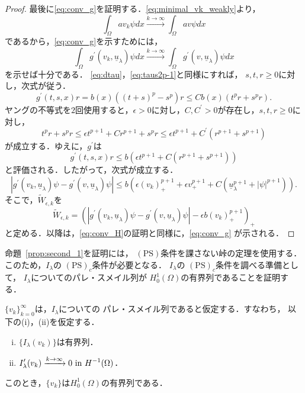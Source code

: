 \begin{proof}
 最後に\eqref{eq:conv_g}を証明する．\eqref{eq:minimal_vk_weakly}より，
 \[
  \int_\Omega a v_k \psi dx \xrightarrow{k \to \infty} \int_\Omega
 av\psi dx
 \]
 であるから，\eqref{eq:conv_g}を示すためには，
 \[
  \int_\Omega g^\prime(v_k, \underline{u}_\lambda)\psi dx \xrightarrow{
  k \to \infty } 
  \int_\Omega g^\prime(v, \underline{u}_\lambda)\psi dx
 \]
 を示せば十分である．
 \eqref{eq:dtau}，\eqref{eq:taus2p-1}と同様にすれば，
 $s, t, r \geq 0$に対し，次式が従う．
 \[
  g^\prime(t, s, x)r = b(x) \left( (t+s)^p - s^p \right) r \leq C b(x)
 \left( t^pr + s^p r \right).
 \]
 ヤングの不等式を$2$回使用すると，$\epsilon > 0$に対し，$C, C^\prime >
 0$が存在し，$s, t, r \geq 0$に対し，
 \[
  t^p r + s^p r \leq \epsilon t^{p+1} + C r^{p+1} + s^p r \leq
 \epsilon t^{p+1} + C^\prime (r^{p+1} + s^{p+1})
 \]
 が成立する．ゆえに，$g^\prime$は
 \[
  g^\prime(t, s, x)r \leq b \left( \epsilon t^{p+1} + C ( r^{p+1} +
 s^{p+1}) \right)
 \]
 と評価される．したがって，次式が成立する．
 \[  
  \left\lvert g^\prime(v_k, \underline{u}_\lambda)\psi - g^\prime(v,
   \underline{u}_\lambda)\psi \right\rvert \leq b \left( \epsilon
   (v_k)_+^{p+1}  + \epsilon v_+^{p+1} + C
   (\underline{u}_\lambda^{p+1} + \lvert \psi \rvert^{p+1})
                                 \right).
 \]
 そこで，$\tilde{W}_{\epsilon, k}$を
\[  \tilde{W}_{\epsilon, k} = 
   \left( \left\lvert g^\prime(v_k, \underline{u}_\lambda)\psi - g^\prime(v,
    \underline{u}_\lambda)\psi \right\rvert
  -\epsilon b (v_k)_+^{p+1}
          \right)_+ \]
 と定める．以降は，\eqref{eq:conv_H}の証明と同様に，\eqref{eq:conv_g}
 が示される．\qedhere
\end{proof}

命題~\ref{prop:second_1}を証明には，
$(\mathrm{PS})$条件を課さない峠の定理を使用する．
このため，$I_\lambda$の
$(\mathrm{PS})_c$条件が必要となる．
$I_\lambda$の
$(\mathrm{PS})_c$条件を調べる準備として，
$I_\lambda$についてのパレ・スメイル列が
$H_0^1(\Omega)$の有界列であることを証明する．

\begin{lem} \label{lem:PS_seq}
 $\{ v_k \}_{k=0}^\infty$は，$I_\lambda$についての
 パレ・スメイル列であると仮定する．すなわち，
 以下の(i)，(ii)を仮定する．
 \begin{enumerate}[(i)]
  \item $\{ I_\lambda(v_k) \}$は有界列．
  \item $\displaystyle I^\prime_{\lambda} (v_k) \xrightarrow{k \to
        \infty} 0 ~\text{in}~ H^{-1}(\Omega)$．
 \end{enumerate}
 このとき，$\{ v_k \}$は$H_0^1(\Omega)$の有界列である．
\end{lem}

